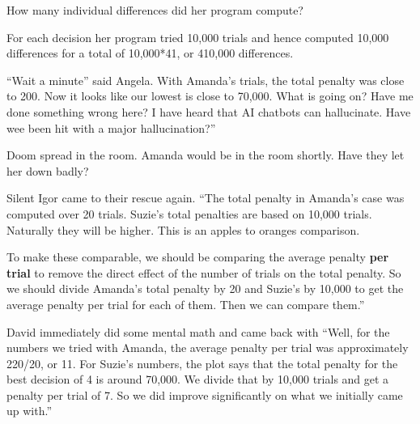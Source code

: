 \documentclass[
  12pt,
  letterpaper,
  DIV=11,
  numbers=noendperiod]{scrreprt}
\begin{document}
\begin{tcolorbox}[enhanced jigsaw, colback=white, leftrule=.75mm, toprule=.15mm, bottomtitle=1mm, breakable, coltitle=black, toptitle=1mm, title={Quick Check}, opacitybacktitle=0.6, colbacktitle=quarto-callout-note-color!10!white, arc=.35mm, left=2mm, colframe=quarto-callout-note-color-frame, titlerule=0mm, rightrule=.15mm, bottomrule=.15mm, opacityback=0]

How many individual differences did her program compute?

\end{tcolorbox}

\begin{tcolorbox}[enhanced jigsaw, colback=white, leftrule=.75mm, toprule=.15mm, bottomtitle=1mm, breakable, coltitle=black, toptitle=1mm, title={Suggested answer}, opacitybacktitle=0.6, colbacktitle=quarto-callout-note-color!10!white, arc=.35mm, left=2mm, colframe=quarto-callout-note-color-frame, titlerule=0mm, rightrule=.15mm, bottomrule=.15mm, opacityback=0]

For each decision her program tried 10,000 trials and hence computed
10,000 differences for a total of 10,000*41, or 410,000 differences.

\end{tcolorbox}

``Wait a minute'' said Angela. With Amanda's trials, the total penalty
was close to 200. Now it looks like our lowest is close to 70,000. What
is going on? Have me done something wrong here? I have heard that AI
chatbots can hallucinate. Have wee been hit with a major
hallucination?''

Doom spread in the room. Amanda would be in the room shortly. Have they
let her down badly?

Silent Igor came to their rescue again. ``The total penalty in Amanda's
case was computed over 20 trials. Suzie's total penalties are based on
10,000 trials. Naturally they will be higher. This is an apples to
oranges comparison.

To make these comparable, we should be comparing the average penalty
\textbf{per trial} to remove the direct effect of the number of trials
on the total penalty. So we should divide Amanda's total penalty by 20
and Suzie's by 10,000 to get the average penalty per trial for each of
them. Then we can compare them.''

David immediately did some mental math and came back with ``Well, for
the numbers we tried with Amanda, the average penalty per trial was
approximately 220/20, or 11. For Suzie's numbers, the plot says that the
total penalty for the best decision of 4 is around 70,000. We divide
that by 10,000 trials and get a penalty per trial of 7. So we did
improve significantly on what we initially came up with.''
\end{document}
